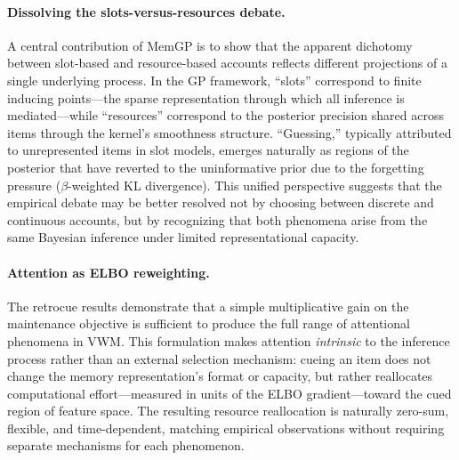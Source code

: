 \documentclass[11pt,letterpaper]{article}
\begin{document}
\paragraph{Dissolving the slots-versus-resources debate.}
A central contribution of MemGP is to show that the apparent dichotomy between slot-based and resource-based accounts reflects different projections of a single underlying process. In the GP framework, ``slots'' correspond to finite inducing points---the sparse representation through which all inference is mediated---while ``resources'' correspond to the posterior precision shared across items through the kernel's smoothness structure. ``Guessing,'' typically attributed to unrepresented items in slot models, emerges naturally as regions of the posterior that have reverted to the uninformative prior due to the forgetting pressure ($\beta$-weighted KL divergence). This unified perspective suggests that the empirical debate may be better resolved not by choosing between discrete and continuous accounts, but by recognizing that both phenomena arise from the same Bayesian inference under limited representational capacity.

\paragraph{Attention as ELBO reweighting.}
The retrocue results demonstrate that a simple multiplicative gain on the maintenance objective is sufficient to produce the full range of attentional phenomena in VWM. This formulation makes attention \emph{intrinsic} to the inference process rather than an external selection mechanism: cueing an item does not change the memory representation's format or capacity, but rather reallocates computational effort---measured in units of the ELBO gradient---toward the cued region of feature space. The resulting resource reallocation is naturally zero-sum, flexible, and time-dependent, matching empirical observations without requiring separate mechanisms for each phenomenon.
\end{document}
